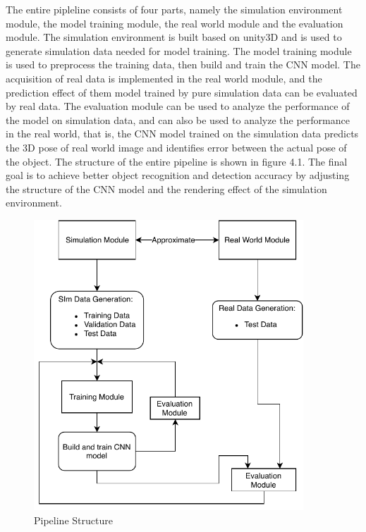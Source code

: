 The entire pipleline consists of four parts, namely the simulation environment module, the model training module, the real world module and the evaluation module. The simulation environment is built based on unity3D and is used to generate simulation data needed for model training. The model training module is used to preprocess the training data, then build and train the CNN model. The acquisition of real data is implemented in the real world module, and the prediction effect of them model trained by pure simulation data can be evaluated by real data. The evaluation module can be used to analyze the performance of the model on simulation data, and can also be used to analyze the performance in the real world, that is, the CNN model trained on the simulation data predicts the 3D pose of real world image and identifies error between the actual pose of the object. The structure of the entire pipeline is shown in figure 4.1. The final goal is to achieve better object recognition and detection accuracy by adjusting the structure of the CNN model and the rendering effect of the simulation environment.
\begin{figure}[h]
	\includegraphics[width=0.9\textwidth]{Figures/Section4_Pipeline_structure.pdf} 
	\centering
	\captionsetup{justification=centering}
	\caption{Pipeline Structure}
	\label{fig:pipeline}
\end{figure}

